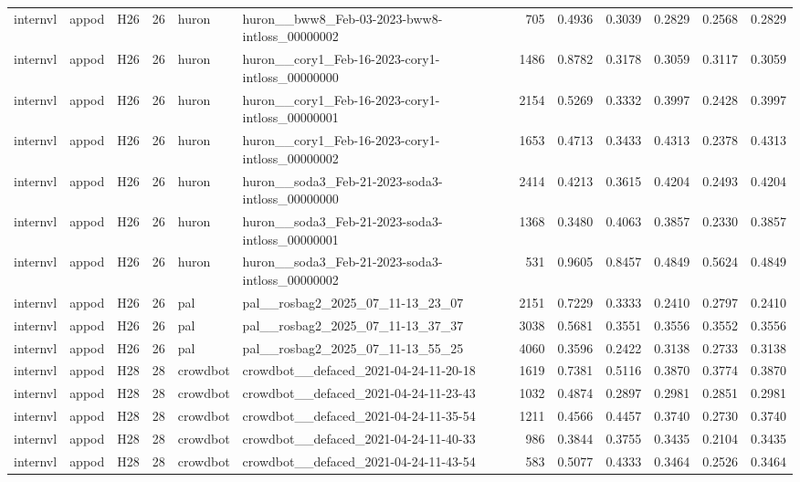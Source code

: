 \begin{table}[tbp]
\begin{tabular}{lllrllrrrrrr}
internvl & appod & H26 & 26 & huron & huron\_\_bww8\_Feb-03-2023-bww8-intloss\_00000002 & 705 & 0.4936 & 0.3039 & 0.2829 & 0.2568 & 0.2829 \\
internvl & appod & H26 & 26 & huron & huron\_\_cory1\_Feb-16-2023-cory1-intloss\_00000000 & 1486 & 0.8782 & 0.3178 & 0.3059 & 0.3117 & 0.3059 \\
internvl & appod & H26 & 26 & huron & huron\_\_cory1\_Feb-16-2023-cory1-intloss\_00000001 & 2154 & 0.5269 & 0.3332 & 0.3997 & 0.2428 & 0.3997 \\
internvl & appod & H26 & 26 & huron & huron\_\_cory1\_Feb-16-2023-cory1-intloss\_00000002 & 1653 & 0.4713 & 0.3433 & 0.4313 & 0.2378 & 0.4313 \\
internvl & appod & H26 & 26 & huron & huron\_\_soda3\_Feb-21-2023-soda3-intloss\_00000000 & 2414 & 0.4213 & 0.3615 & 0.4204 & 0.2493 & 0.4204 \\
internvl & appod & H26 & 26 & huron & huron\_\_soda3\_Feb-21-2023-soda3-intloss\_00000001 & 1368 & 0.3480 & 0.4063 & 0.3857 & 0.2330 & 0.3857 \\
internvl & appod & H26 & 26 & huron & huron\_\_soda3\_Feb-21-2023-soda3-intloss\_00000002 & 531 & 0.9605 & 0.8457 & 0.4849 & 0.5624 & 0.4849 \\
internvl & appod & H26 & 26 & pal & pal\_\_rosbag2\_2025\_07\_11-13\_23\_07 & 2151 & 0.7229 & 0.3333 & 0.2410 & 0.2797 & 0.2410 \\
internvl & appod & H26 & 26 & pal & pal\_\_rosbag2\_2025\_07\_11-13\_37\_37 & 3038 & 0.5681 & 0.3551 & 0.3556 & 0.3552 & 0.3556 \\
internvl & appod & H26 & 26 & pal & pal\_\_rosbag2\_2025\_07\_11-13\_55\_25 & 4060 & 0.3596 & 0.2422 & 0.3138 & 0.2733 & 0.3138 \\
internvl & appod & H28 & 28 & crowdbot & crowdbot\_\_defaced\_2021-04-24-11-20-18 & 1619 & 0.7381 & 0.5116 & 0.3870 & 0.3774 & 0.3870 \\
internvl & appod & H28 & 28 & crowdbot & crowdbot\_\_defaced\_2021-04-24-11-23-43 & 1032 & 0.4874 & 0.2897 & 0.2981 & 0.2851 & 0.2981 \\
internvl & appod & H28 & 28 & crowdbot & crowdbot\_\_defaced\_2021-04-24-11-35-54 & 1211 & 0.4566 & 0.4457 & 0.3740 & 0.2730 & 0.3740 \\
internvl & appod & H28 & 28 & crowdbot & crowdbot\_\_defaced\_2021-04-24-11-40-33 & 986 & 0.3844 & 0.3755 & 0.3435 & 0.2104 & 0.3435 \\
internvl & appod & H28 & 28 & crowdbot & crowdbot\_\_defaced\_2021-04-24-11-43-54 & 583 & 0.5077 & 0.4333 & 0.3464 & 0.2526 & 0.3464 \\

\end{tabular}
\end{table}
